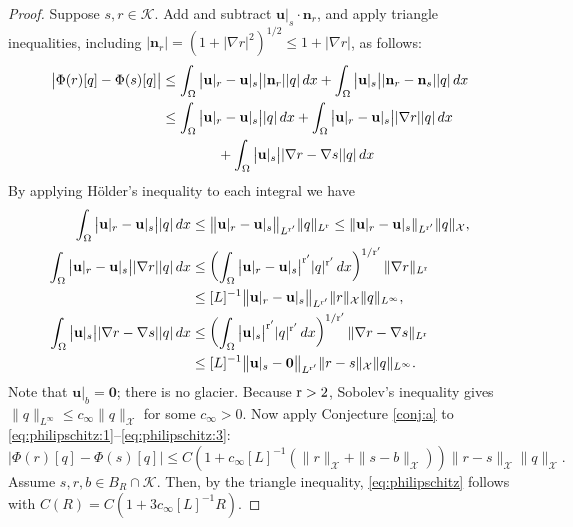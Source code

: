 \documentclass[hidelinks,onefignum,onetabnum,final]{siamart220329}  %
\newcommand{\grad}{\nabla}
\newcommand{\bn}{\mathbf{n}}
\newcommand{\bu}{\mathbf{u}}
\newcommand{\bzero}{\bm{0}}
\newcommand{\cK}{\mathcal{K}}
\newcommand{\cX}{\mathcal{X}}
\newcommand{\rr}{{\text{\textnormal{r}}}}
\begin{document}
\begin{proof}  Suppose $s,r\in\cK$.  Add and subtract $\bu|_s \cdot \bn_r$, and apply triangle inequalities, including $|\bn_r|=\left(1+|\grad r|^2\right)^{1/2} \le 1 + |\grad r|$, as follows:
\begin{align}
\big|\Phi(r)[q] - \Phi(s)[q]\big| &\le \int_\Omega \big|\bu|_r - \bu|_s\big| |\bn_r| |q|\,dx + \int_\Omega \big|\bu|_s\big| |\bn_r-\bn_s| |q|\,dx \\
    &\le \int_\Omega \big|\bu|_r - \bu|_s\big| |q|\,dx + \int_\Omega \big|\bu|_r - \bu|_s\big| |\grad r| |q|\,dx \notag \\
    &\qquad\qquad + \int_\Omega \big|\bu|_s\big| |\grad r-\grad s| |q|\,dx \notag
\end{align}
By applying H\"older's inequality to each integral we have
\begin{align}
\int_\Omega \big|\bu|_r - \bu|_s\big| |q|\,dx &\le \big\|\bu|_r - \bu|_s\big\|_{L^{\rr'}} \|q\|_{L^{\rr}} \le \|\bu|_r - \bu|_s\|_{L^{\rr'}} \|q\|_{\cX}, \label{eq:philipschitz:1} \\
\int_\Omega \big|\bu|_r - \bu|_s\big| |\grad r| |q|\,dx &\le \left(\int_\Omega \big|\bu|_r - \bu|_s\big|^{\rr'} |q|^{\rr'}\, dx\right)^{1/\rr'} \|\grad r\|_{L^\rr} \label{eq:philipschitz:2} \\
    &\le [L]^{-1} \big\|\bu|_r - \bu|_s\big\|_{L^{\rr'}} \|r\|_{\cX} \|q\|_{L^\infty}, \notag \\
\int_\Omega \big|\bu|_s\big| |\grad r-\grad s| |q|\,dx &\le \left(\int_\Omega \big|\bu|_s\big|^{\rr'} |q|^{\rr'}\, dx\right)^{1/\rr'} \|\grad r- \grad s\|_{L^\rr}  \label{eq:philipschitz:3} \\
    &\le [L]^{-1} \big\|\bu|_s - \bzero\big\|_{L^{\rr'}} \|r-s\|_{\cX} \|q\|_{L^\infty}. \notag
\end{align}
Note that $\bu|_b=\bzero$; there is no glacier.  Because $\rr>2$, Sobolev's inequality gives $\|q\|_{L^\infty} \le c_\infty \|q\|_\cX$ for some $c_\infty>0$.  Now apply Conjecture \ref{conj:a} to \eqref{eq:philipschitz:1}--\eqref{eq:philipschitz:3}:
\begin{equation}
\big|\Phi(r)[q] - \Phi(s)[q]\big| \le C \left(1 + c_\infty [L]^{-1} \left(\|r\|_{\cX} + \|s - b\|_{\cX}\right)\right) \|r-s\|_{\cX} \|q\|_{\cX}.
\end{equation}
Assume $s,r,b\in B_R\cap \cK$.  Then, by the triangle inequality, \eqref{eq:philipschitz} follows with $C(R) = C \left(1 + 3 c_\infty [L]^{-1} R\right)$.
\end{proof}
\end{document}
